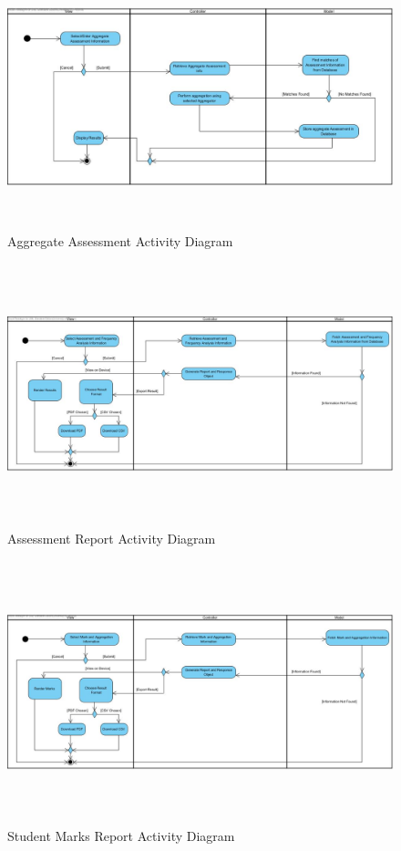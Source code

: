 \documentclass[12pt]{article}
\begin{document}
						\begin{figure}[h]
										\centering
										\includegraphics[width=6in, height=3in]{Pictures/AggregateAssesmentActivityDiagram.jpg}
										\caption{Aggregate Assessment Activity Diagram}
						\end{figure}
						\FloatBarrier
						\begin{figure}[h]
										\centering
										\includegraphics[width=6in, height=3in]{Pictures/AssessmentReportActivityDiagram.jpg}
										\caption{Assessment Report Activity Diagram}
						\end{figure}
						\FloatBarrier
						\begin{figure}[h]
										\centering
										\includegraphics[width=6in, height=3in]{Pictures/StudentMarksReport.jpg}
										\caption{Student Marks Report Activity Diagram}
						\end{figure}
\end{document}
